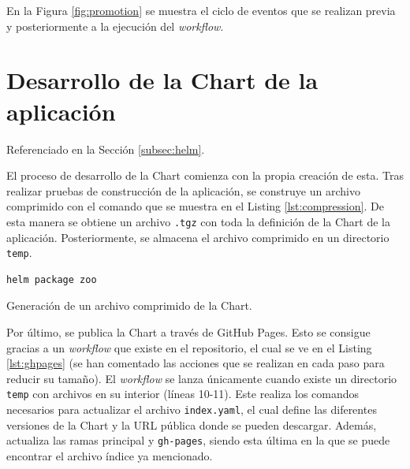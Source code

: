 En la Figura \ref{fig:promotion} se muestra el ciclo de eventos que se realizan previa y posteriormente a la ejecución del \textit{workflow}.


\section{Desarrollo de la Chart de la aplicación}
\label{sec:chart}

Referenciado en la Sección \ref{subsec:helm}.

El proceso de desarrollo de la Chart comienza con la propia creación de esta. Tras realizar pruebas de construcción de la aplicación, se construye un archivo comprimido con el comando que se muestra en el Listing \ref{lst:compression}. De esta manera se obtiene un archivo \texttt{.tgz} con toda la definición de la Chart de la aplicación. Posteriormente, se almacena el archivo comprimido en un directorio \texttt{temp}.

\begin{listing}[!ht]
  \begin{verbatim}
helm package zoo
\end{verbatim}
\caption{Generación de un archivo comprimido de la Chart.}
\label{lst:compression}
\end{listing}

Por último, se publica la Chart a través de GitHub Pages. Esto se consigue gracias a un \textit{workflow} que existe en el repositorio, el cual se ve en el Listing \ref{lst:ghpages} (se han comentado las acciones que se realizan en cada paso para reducir su tamaño). El \textit{workflow} se lanza únicamente cuando existe un directorio \texttt{temp} con archivos en su interior (líneas 10-11). Este realiza los comandos necesarios para actualizar el archivo \texttt{index.yaml}, el cual define las diferentes versiones de la Chart y la URL pública donde se pueden descargar. Además, actualiza las ramas principal y \texttt{gh-pages}, siendo esta última en la que se puede encontrar el archivo índice ya mencionado.

